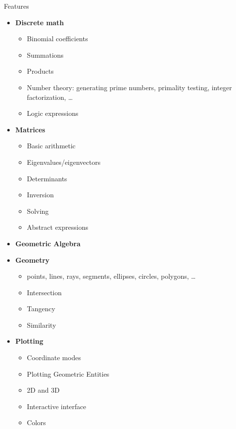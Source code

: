 \documentclass[xcolor=svgnames]{beamer}
\begin{document}
\begin{frame}{Features}
\begin{multicols}{2}
\begin{itemize}
\tiny
    \item \textbf{Discrete math}
      \begin{itemize}
        \tiny
      \item Binomial coefficients
      \item Summations
      \item Products
      \item Number theory: generating prime numbers, primality testing, integer
        factorization, \ldots
      \item Logic expressions
      \end{itemize}

    \item \textbf{Matrices}
      \begin{itemize}
        \tiny
      \item Basic arithmetic
      \item Eigenvalues/eigenvectors
      \item Determinants
      \item Inversion
      \item Solving
      \item Abstract expressions
      \end{itemize}


    \item \textbf{Geometric Algebra}


    \item \textbf{Geometry}
      \begin{itemize}
        \tiny
      \item points, lines, rays, segments, ellipses, circles, polygons, \ldots
      \item Intersection
      \item Tangency
      \item Similarity
      \end{itemize}

    \item \textbf{Plotting}
      \begin{itemize}
        \tiny
      \item Coordinate modes
      \item Plotting Geometric Entities
      \item 2D and 3D
      \item Interactive interface
      \item Colors
      \end{itemize}


\end{itemize}
\end{multicols}
\end{frame}
\end{document}
